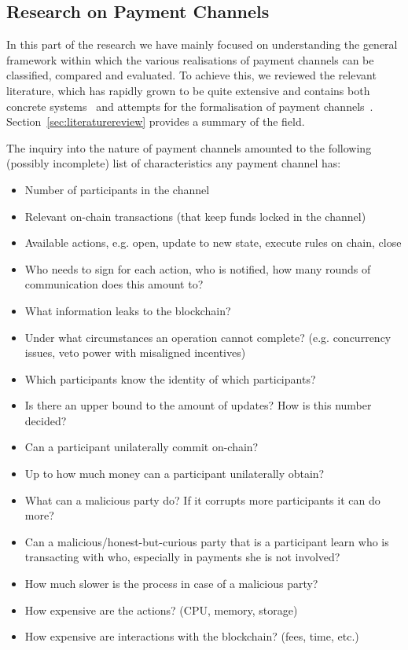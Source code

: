 \subsection{Research on Payment Channels}
  In this part of the research we have mainly focused on understanding the general
  framework within which the various realisations of payment channels can be classified,
  compared and evaluated. To achieve this, we reviewed the relevant literature, which has
  rapidly grown to be quite extensive and contains both concrete
  systems~\cite{abunchofthings} and attempts for the formalisation of payment
  channels~\cite{statechannels}. Section~\ref{sec:literaturereview} provides a summary of
  the field.

  The inquiry into the nature of payment channels amounted to the following (possibly
  incomplete) list of characteristics any payment channel has:
  \begin{itemize}
    \item Number of participants in the channel
    \item Relevant on-chain transactions (that keep funds locked in the channel)
    \item Available actions, e.g. open, update to new state, execute rules on chain, close
    \item Who needs to sign for each action, who is notified, how many rounds of
    communication does this amount to?
    \item What information leaks to the blockchain?
    \item Under what circumstances an operation cannot complete? (e.g. concurrency issues,
    veto power with misaligned incentives)
    \item Which participants know the identity of which participants?
    \item Is there an upper bound to the amount of updates? How is this number decided?
    \item Can a participant unilaterally commit on-chain?
    \item Up to how much money can a participant unilaterally obtain?
    \item What can a malicious party do? If it corrupts more participants it can do more?
    \item Can a malicious/honest-but-curious party that is a participant learn who is
    transacting with who, especially in payments she is not involved?
    \item How much slower is the process in case of a malicious party?
    \item How expensive are the actions? (CPU, memory, storage)
    \item How expensive are interactions with the blockchain? (fees, time, etc.)
  \end{itemize}
